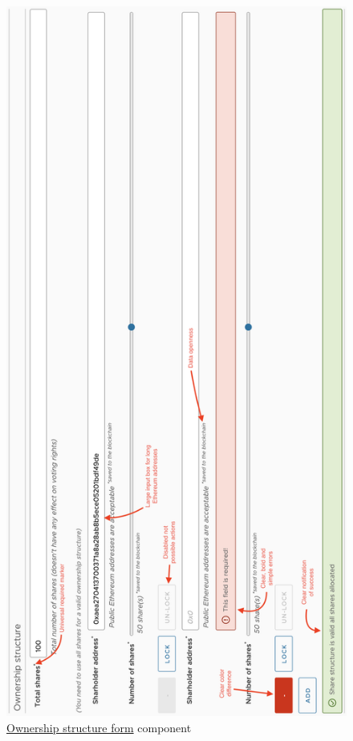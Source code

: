 \documentclass[12pt]{article}
\begin{document}
\begin{figure}[H]
\caption{\href{https://github.com/MrHarrisonBarker/CRPL/tree/main/CRPL.Web/ClientApp/src/app/Forms/ownership-structure-form}{Ownership structure form} component}
\centering
\includegraphics[width=\textwidth,height=\textheight,keepaspectratio]{images/wireframe/ownership-structure}
\end{figure}
\end{document}
